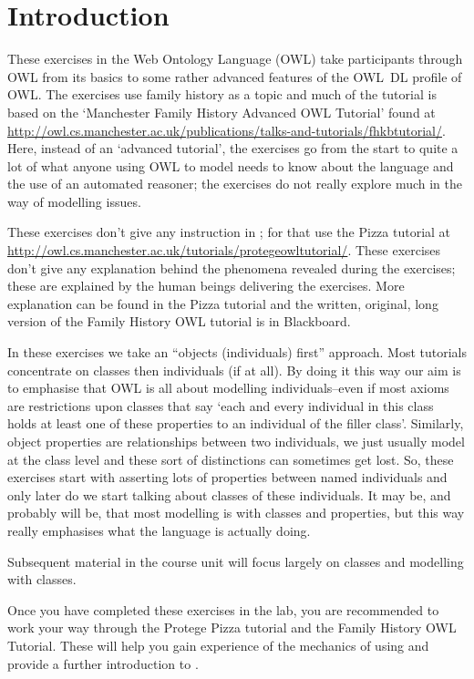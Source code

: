 \chapter{Introduction}


These exercises in the Web Ontology Language (OWL) take participants through OWL from its basics to some rather advanced features of the OWL~DL profile of OWL. The exercises use family history as a topic and much of the tutorial is based on the `Manchester Family History Advanced OWL Tutorial' found at \url{http://owl.cs.manchester.ac.uk/publications/talks-and-tutorials/fhkbtutorial/}. Here, instead of an `advanced tutorial', the exercises go from the start to quite a lot of what anyone using OWL to model needs to know about the language and the use of an automated reasoner; the exercises do not really explore much in the way of modelling issues.	 

These exercises don't give any instruction in \protege; for that use the Pizza tutorial at \url{http://owl.cs.manchester.ac.uk/tutorials/protegeowltutorial/}. These exercises don't give any explanation behind the phenomena revealed during the exercises; these are explained by the human beings delivering the exercises. More explanation can be found in the Pizza tutorial and the written, original, long version of the Family History OWL tutorial is in Blackboard.

In these exercises we take an ``objects (individuals) first'' approach. Most tutorials concentrate on classes then individuals (if at all). By doing it this way our aim is to emphasise  that OWL is all about modelling individuals--even if most axioms are restrictions upon classes that say `each and every individual in this class holds at least one of these properties to an individual of the filler class'. Similarly, object properties are relationships between two individuals, we just usually model at the class level and these sort of distinctions can sometimes get lost. So, these exercises start with asserting lots of properties between named individuals and only later do we start talking about classes of these individuals. It may be, and probably will be, that most modelling is with classes and properties, but this way really emphasises what the language is actually doing.

Subsequent material in the course unit will focus largely on classes and modelling with classes. 

Once you have completed these exercises in the lab, you are recommended to work your way through the Protege Pizza tutorial and the Family History OWL Tutorial. These will help you gain experience of the mechanics of using \protege and provide a further introduction to \owlii. 

